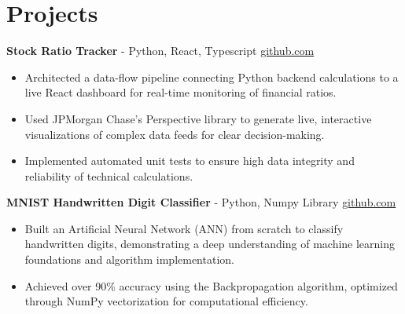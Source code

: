 \documentclass[11pt]{article}       %
\begin{document}

\vspace{-18.5pt}

\section*{Projects}

\textbf{Stock Ratio Tracker}{ - Python, React, Typescript} \hfill \href{https://github.com/Monica20030707/tradingDashboard-UI}{github.com} \\
\vspace{-9pt}
\begin{itemize}
  \item Architected a data-flow pipeline connecting Python backend calculations to a live React dashboard for real-time monitoring of financial ratios.
  \item Used JPMorgan Chase’s Perspective library to generate live, interactive visualizations of complex data feeds for clear decision-making.
  \item Implemented automated unit tests to ensure high data integrity and reliability of technical calculations.
\end{itemize}


\textbf{MNIST Handwritten Digit Classifier}{ - Python, Numpy Library} \hfill \href{https://github.com/Monica20030707/Artificial-Neutral-Network_ML}{github.com} \\
\vspace{-9pt}
\begin{itemize} 
  \item Built an Artificial Neural Network (ANN) from scratch to classify handwritten digits, demonstrating a deep understanding of machine learning foundations and algorithm implementation. 
  \item Achieved over 90\% accuracy using the Backpropagation algorithm, optimized through NumPy vectorization for computational efficiency.
\end{itemize}
\end{document}
